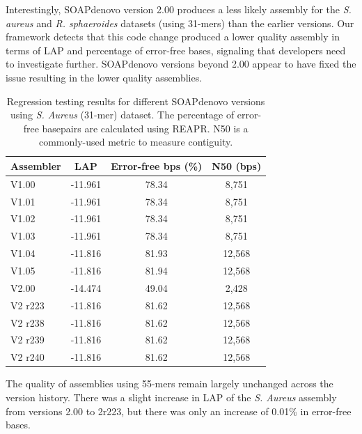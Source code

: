\documentclass[12pt,\mydriver]{thesis}
\begin{document}
Interestingly, SOAPdenovo version 2.00 produces a less likely assembly for the \emph{S. aureus} and \emph{R. sphaeroides} datasets (using 31-mers) than the earlier versions.
Our framework detects that this code change produced a lower quality assembly in terms of LAP and percentage of error-free bases, signaling that developers need to investigate further.
SOAPdenovo versions beyond 2.00 appear to have fixed the issue resulting in the lower quality assemblies.




\renewcommand{\baselinestretch}{1}
\small\normalsize


\begin{table}[tb!]
\begin{center}
\caption{Regression testing results for different SOAPdenovo versions using \emph{S. Aureus} (31-mer) dataset.  The percentage of error-free basepairs are calculated using REAPR. N50 is a commonly-used metric to measure contiguity.}
\begin{tabular}{l|ccc}
Assembler & LAP        & Error-free bps (\%) & N50 (bps)    \\
\hline
V1.00   & -11.961 & 78.34 & 8,751  \\
V1.01   & -11.961 & 78.34 & 8,751  \\
V1.02   & -11.961 & 78.34 & 8,751  \\
V1.03   & -11.961 & 78.34 & 8,751  \\
V1.04   & -11.816 & 81.93 & 12,568 \\
V1.05   & -11.816 & 81.94 & 12,568 \\
V2.00   & -14.474 & 49.04 & 2,428  \\
V2 r223 & -11.816 & 81.62 & 12,568 \\
V2 r238 & -11.816 & 81.62 & 12,568 \\
V2 r239 & -11.816 & 81.62 & 12,568 \\
V2 r240 & -11.816 & 81.62 & 12,568 \\
\hline
\end{tabular}
\end{center}
\label{table:soapdenovo_crudii}
\end{table}
\renewcommand{\baselinestretch}{2}
\small\normalsize



The quality of assemblies using 55-mers remain largely unchanged across the version history.
There was a slight increase in LAP of the \emph{S. Aureus} assembly from versions 2.00 to 2r223, but there was only an increase of 0.01\% in error-free bases.
\end{document}
